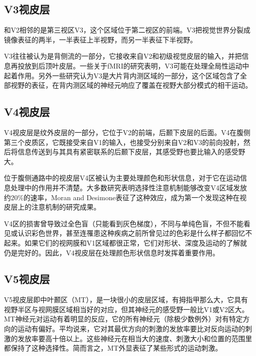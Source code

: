 \documentclass[a4paper,10pt]{article}\large
\begin{document}
\subsection{V3视皮层}


和V2相邻的是第三视区V3\cite{9:article}，这个区域位于第二视区的前端。V3把视觉世界分裂成镜像表征的两半，一半表征上半视野，而另一半表征下半视野。
        

V3往往被认为是背侧流的一部分，它接收来自V2和初级视觉皮层的输入，并把信息再投放到后顶叶皮层。一些关于fMRI的研究表明，V3可能在处理全局性运动\cite{10:article}中起着作用。另外一些研究认为V3是大片背内测区域的一部分，这个区域包含了全部视野的表征，在背内测区域的神经元响应了覆盖在视野大部分模式的相干运动。


\subsection{V4视皮层}


V4视皮层是纹外皮层的一部分，它位于V2的前端，后颞下皮层的后面。V4在腹侧第三个皮质区\cite{5:article}，它既接受来自V1的输入，也接受分别来自V2和V3的前向投射，然后将信息传送到与其具有紧密联系的后颞下皮层，其感受野也要比输入的感受野大。
        

位于腹侧通路中的视皮层V4区被认为主要处理颜色和形状信息，对于它在运动信息处理中的作用并不清楚\cite{15:book}。大多数研究表明选择性注意机制能够改变V4区域发放约20\%的速率，Moran and Desimone表征了这种效应，成为第一个发现这种在视皮层上的注意机制的研究成果。
        

V4区的损害\cite{12:book}曾导致过全色盲（只能看到灰色梯度），不同与单纯色盲，不但不能看见或认识彩色世界，甚至连罹患这种疾病之前所曾见过的色彩是什么样子都回忆不起来。如果它们的视网膜和V1区域都很正常，它们对形状、深度及运动的了解就仍是完好的。因此，V4视皮层在处理颜色形状信息时发挥着重要作用。


\subsection{V5视皮层}



V5视皮层即中叶颞区（MT）\cite{7:article}，是一块很小的皮层区域，有拇指甲那么大，它具有视野半区与视网膜区域相当好的对应，但其神经元的感受野一般比V1或V2区大。MT神经元对运动有着明显的反应，它的所有神经元（除极少数例外）对有特定方向的运动有偏好。平均说来，它对其最优方向的刺激的发放率要比对反向运动的刺激的发放率要高十倍以上。这些神经元在相当大的速度、刺激大小和位置的范围里都保持了这种选择性。简而言之，MT外显表征了某些形式的运动刺激。
       
\end{document}
